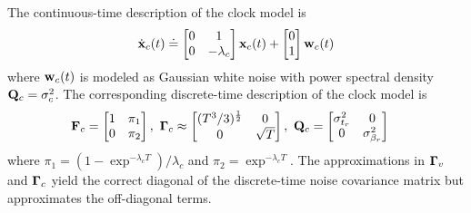 The continuous-time description of the clock model is 
\begin{align}
	\dot{\mathbf{x}}_c(t) \doteq 
	\begin{bmatrix}
		0 & 1 \\ 0 & -\lambda_c
	\end{bmatrix} 
	\mathbf{x}_c(t) +
	\begin{bmatrix} 0 \\ 1 \end{bmatrix} \mathbf{w}_c(t)
\end{align}
where $\mathbf{w}_c(t)$ is modeled as Gaussian white noise with power spectral density $\mathbf{Q}_c = \sigma_c^2$. 
The corresponding discrete-time description of the clock model is 
\begin{align}
	& \mathbf{F}_c = 
	\begin{bmatrix}
		1 & \pi_1 \\ 0 & \pi_2
	\end{bmatrix}, ~
	\boldsymbol{\Gamma}_c \approx
	\begin{bmatrix}
		(T^3 / 3)^{\frac{1}{2}} & 0 \\
		0 & \sqrt{T}
	\end{bmatrix}, ~  
	\mathbf{Q}_{c} = 
	\begin{bmatrix}
		\sigma_{t_r}^2 & 0 \\ 0 & \sigma_{\beta_r}^2
	\end{bmatrix}
\end{align}
where $\pi_1 = (1 - \exp^{-\lambda_c T})/ \lambda_c$ and $\pi_2 = \exp^{-\lambda_c T}$.
The approximations in $\boldsymbol{\Gamma}_v$ and $\boldsymbol{\Gamma}_c$ yield the correct diagonal of the discrete-time noise covariance matrix but approximates the off-diagonal terms.

